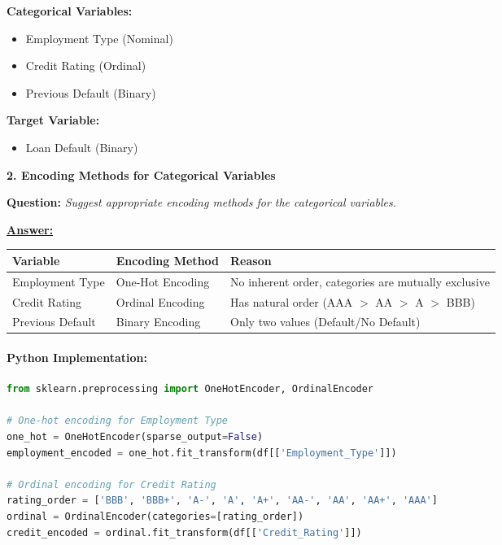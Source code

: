 \documentclass[11pt,a4paper]{article}
\newcommand{\questiontitle}[2]{%
    \vspace{0.4cm}%
    \noindent\textbf{\large\color{headerblue}#1. #2}\par\vspace{0.15cm}%
}
\newcommand{\qprompt}[1]{%
    \noindent\textbf{Question:} \textit{#1}\par\vspace{0.2cm}%
}
\newcommand{\answer}{\noindent\textbf{\underline{Answer:}}\par\vspace{0.15cm}}
\begin{document}
\noindent\textbf{Categorical Variables:}
\begin{itemize}
    \item Employment Type (Nominal)
    \item Credit Rating (Ordinal)
    \item Previous Default (Binary)
\end{itemize}

\noindent\textbf{Target Variable:}
\begin{itemize}
    \item Loan Default (Binary)
\end{itemize}

\vspace{0.35cm}

\questiontitle{2}{Encoding Methods for Categorical Variables}
\qprompt{Suggest appropriate encoding methods for the categorical variables.}
\answer
\begin{center}
\begin{tabularx}{\textwidth}{l l X}
\toprule
\textbf{Variable} & \textbf{Encoding Method} & \textbf{Reason} \\
\midrule
Employment Type & One-Hot Encoding & No inherent order, categories are mutually exclusive \\
Credit Rating & Ordinal Encoding & Has natural order (AAA $>$ AA $>$ A $>$ BBB) \\
Previous Default & Binary Encoding & Only two values (Default/No Default) \\
\bottomrule
\end{tabularx}
\end{center}

\paragraph{Python Implementation:}
\begin{lstlisting}[language=Python]
from sklearn.preprocessing import OneHotEncoder, OrdinalEncoder

# One-hot encoding for Employment Type
one_hot = OneHotEncoder(sparse_output=False)
employment_encoded = one_hot.fit_transform(df[['Employment_Type']])

# Ordinal encoding for Credit Rating
rating_order = ['BBB', 'BBB+', 'A-', 'A', 'A+', 'AA-', 'AA', 'AA+', 'AAA']
ordinal = OrdinalEncoder(categories=[rating_order])
credit_encoded = ordinal.fit_transform(df[['Credit_Rating']])
\end{lstlisting}
\end{document}
